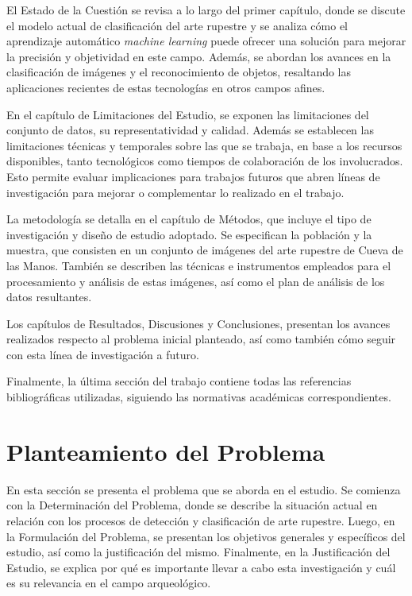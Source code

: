 El Estado de la Cuestión se revisa a lo largo del primer capítulo, donde se discute el modelo actual de clasificación del arte rupestre y se analiza cómo el aprendizaje automático \textit{machine learning} puede ofrecer una solución para mejorar la precisión y objetividad en este campo. Además, se abordan los avances en la clasificación de imágenes y el reconocimiento de objetos, resaltando las aplicaciones recientes de estas tecnologías en otros campos afines.

En el capítulo de Limitaciones del Estudio, se exponen las limitaciones del conjunto de datos, su representatividad y calidad. Además se establecen las limitaciones técnicas y temporales sobre las que se trabaja, en base a los recursos disponibles, tanto tecnológicos como tiempos de colaboración de los involucrados. Esto permite evaluar implicaciones para trabajos futuros que abren líneas de investigación para mejorar o complementar lo realizado en el trabajo.

La metodología se detalla en el capítulo de Métodos, que incluye el tipo de investigación y diseño de estudio adoptado. Se especifican la población y la muestra, que consisten en un conjunto de imágenes del arte rupestre de Cueva de las Manos. También se describen las técnicas e instrumentos empleados para el procesamiento y análisis de estas imágenes, así como el plan de análisis de los datos resultantes.

Los capítulos de Resultados, Discusiones y Conclusiones, presentan los avances realizados respecto al problema inicial planteado, así como también cómo seguir con esta línea de investigación a futuro.

Finalmente, la última sección del trabajo contiene todas las referencias bibliográficas utilizadas, siguiendo las normativas académicas correspondientes.

\section{Planteamiento del Problema}

En esta sección se presenta el problema que se aborda en el estudio. Se comienza con la Determinación del Problema, donde se describe la situación actual en relación con los procesos de detección y clasificación de arte rupestre. Luego, en la Formulación del Problema, se presentan los objetivos generales y específicos del estudio, así como la justificación del mismo. Finalmente, en la Justificación del Estudio, se explica por qué es importante llevar a cabo esta investigación y cuál es su relevancia en el campo arqueológico.

